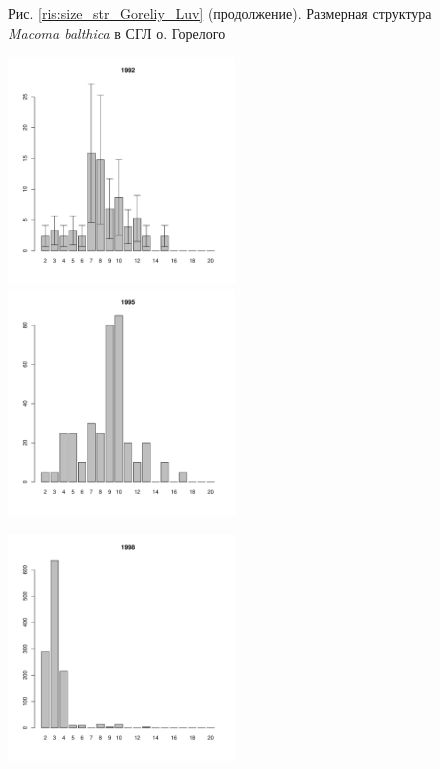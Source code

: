 \documentclass[12pt, a4paper]{article}
\begin{document}
\begin{figure}[h]


\begin{center}
Рис. \ref{ris:size_str_Goreliy_Luv} (продолжение). Размерная структура {\it Macoma balthica} в СГЛ о. Горелого

\end{center}
\end{figure}



\newpage \begin{figure}[h] 

\begin{multicols}{3}
\hfill
\includegraphics[width=60mm]{../White_Sea/Luvenga_Goreliy/midlow2_1992_.pdf}
\hfill
\includegraphics[width=60mm]{../White_Sea/Luvenga_Goreliy/midlow2_1995_.pdf}

\hfill
\includegraphics[width=60mm]{../White_Sea/Luvenga_Goreliy/midlow2_1998_.pdf}


\end{multicols}
\end{figure}
\end{document}
